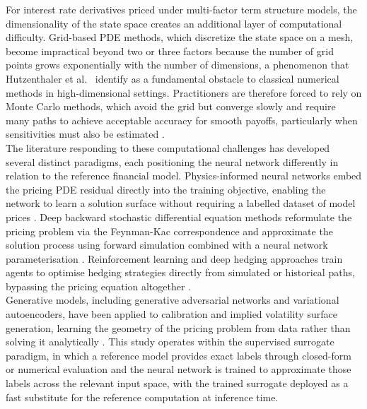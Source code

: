     \noindent
    For interest rate derivatives priced under multi-factor term structure models, the dimensionality of the state space creates an additional layer of computational difficulty. Grid-based PDE methods, which discretize the state space on a mesh, become impractical beyond two or three factors because the number of grid points grows exponentially with the number of dimensions, a phenomenon that Hutzenthaler et al.\ \cite{hutzenthaler2020overcoming} identify as a fundamental obstacle to classical numerical methods in high-dimensional settings. Practitioners are
    therefore forced to rely on Monte Carlo methods, which avoid the grid but converge slowly and require many paths to achieve acceptable accuracy for smooth payoffs, particularly when sensitivities must also be estimated \cite{choi2023calibrate}. \\

    \noindent
    The literature responding to these computational challenges has developed several distinct paradigms, each positioning the neural network differently in relation to the reference financial model. Physics-informed neural networks embed the pricing PDE residual directly into the training objective, enabling the network to learn a solution surface without requiring a labelled dataset of model prices \cite{bai2022pinn}. Deep backward stochastic differential equation methods reformulate the pricing problem via the Feynman-Kac correspondence and approximate the solution process using forward simulation combined with a neural network parameterisation \cite{yu2023backward}. Reinforcement learning and deep hedging approaches train agents to optimise hedging strategies directly from simulated or historical paths, bypassing the pricing equation altogether \cite{cao2020deephedging}. \\

    \noindent
    Generative models, including generative adversarial networks and variational autoencoders, have been applied to calibration and implied volatility surface generation, learning the geometry of the pricing problem from data rather than solving it analytically \cite{cuchiero2020gan}. This study operates within the supervised surrogate paradigm, in which a reference model provides exact labels through closed-form or numerical evaluation and the neural network is trained to approximate those labels across the relevant input space, with the trained surrogate deployed as a fast substitute for the reference computation at inference time. \\

